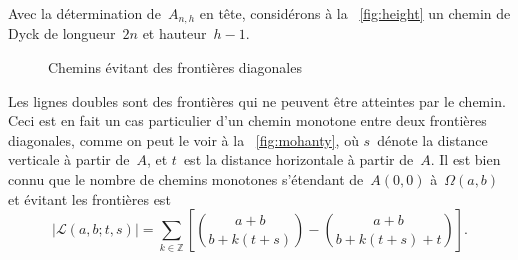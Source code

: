 Avec la détermination de~\(A_{n,h}\) en tête, considérons à la
\fig~\ref{fig:height} un chemin de Dyck de longueur~\(2n\) et
hauteur~\(h-1\).
\begin{figure}[!b]
\centering
{}
\quad
{}
\caption{Chemins évitant des frontières diagonales\label{fig:boundaries}}
\end{figure}
Les lignes doubles sont des frontières qui ne peuvent être atteintes
par le chemin. Ceci est en fait un cas particulier d'un chemin
monotone entre deux frontières diagonales, comme on peut le voir à la
\fig~\ref{fig:mohanty}, où \(s\)~dénote la distance verticale à partir
de~\(A\), et \(t\)~est la distance horizontale à partir de~\(A\). Il
est bien connu que le nombre de chemins monotones s'étendant
de~\(A(0,0)\) à~\(\Omega(a,b)\) et évitant les frontières est
\begin{equation}
\left\lvert\mathcal{L}(a,b;t,s)\right\rvert = \sum_{k \in \mathbb{Z}}\left[\binom{a+b}{b+k(t+s)} - \binom{a+b}{b+k(t+s)+t}\right].
\label{eq_mohanty}
\end{equation}

